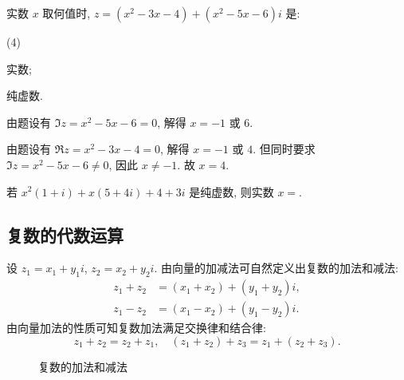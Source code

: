 \begin{example}
  实数 $x$ 取何值时, $z=(x^2-3x-4)+(x^2-5x-6)i$ 是:
  \begin{tasksexam}(4)
    \item 实数;
    \item 纯虚数.
  \end{tasksexam}
\end{example}
\begin{solution}\delspace
  \begin{enumnopar}[(i)]
    \item 由题设有 $\Im z=x^2-5x-6=0$, 解得 $x=-1$ 或 $6$.
    \item 由题设有 $\Re z=x^2-3x-4=0$, 解得 $x=-1$ 或 $4$.
      但同时要求 $\Im z=x^2-5x-6\neq 0$, 因此 $x\neq -1$.
      故 $x=4$.
  \end{enumnopar}
\end{solution}

\begin{exercise}
  若 $x^2(1+i)+x(5+4i)+4+3i$ 是纯虚数, 则实数 $x=$\fillblank{}.
\end{exercise}


\subsection{复数的代数运算}


设 $z_1=x_1+y_1i$, $z_2=x_2+y_2i$.
由向量的加减法可自然定义出复数的加法和减法:
\begin{align*}
  z_1+z_2&=(x_1+x_2)+(y_1+y_2)i,\\
  z_1-z_2&=(x_1-x_2)+(y_1-y_2)i.
\end{align*}
由向量加法的性质可知复数加法满足交换律和结合律:
\[
  z_1+z_2=z_2+z_1,\quad
  (z_1+z_2)+z_3=z_1+(z_2+z_3).
\]

\begin{figure}[!ht]
  \centering
  \caption{复数的加法和减法}
\end{figure}


